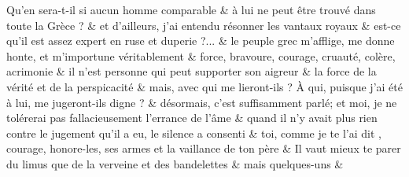 \documentclass[12pt,onecolumn,twoside,a4paper]{memoir}
\begin{document}
\begin{pairs}
\begin{Rightside}
                         \stanza  Qu’en sera-t-il si aucun homme comparable  & 
                     à lui ne peut être trouvé dans toute la Grèce ? \&
                         \stanza 
                      et d’ailleurs, j’ai entendu résonner les vantaux royaux  \&
                         \stanza 
                      est-ce qu’il est assez expert en ruse et duperie ?... \&
                         \stanza 
                      le peuple grec m’afflige, me donne honte, et m’importune
                              véritablement \&
                         \stanza 
                      force, bravoure, courage, cruauté, colère, acrimonie \&
                         \stanza 
                      il n’est personne qui peut supporter son aigreur \&
                         \stanza 
                      la force de la vérité et de la perspicacité \&
                         \stanza 
                      mais, avec qui me lieront-ils ? À qui, puisque j’ai été à lui, me
                              jugeront-ils digne ? \&
                         \stanza 
                      désormais, c’est suffisamment parlé; et moi, je ne tolérerai pas
                              fallacieusement l’errance de l’âme  \&
                         \stanza 
                      quand il n’y avait plus rien contre le jugement qu’il a eu, le
                              silence a consenti \&
                         \stanza 
                      toi, comme je te l’ai dit , courage, honore-les, ses armes et la
                              vaillance de ton père \&
                         \stanza 
                      Il vaut mieux te parer du limus que de la verveine et des
                              bandelettes \&
                         \stanza 
                      mais quelques-uns \&
                     
                  \endnumbering
		\end{Rightside}
               \end{pairs}
	\Columns
            


            
\end{document}

